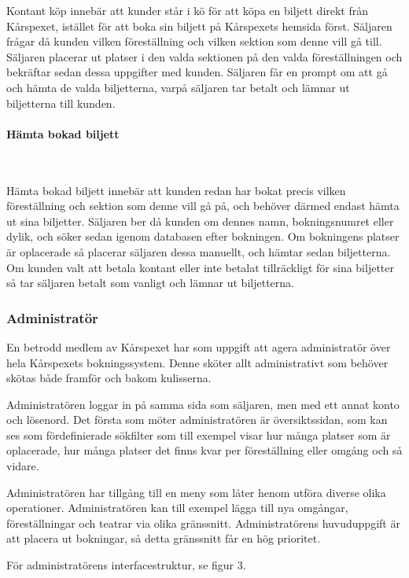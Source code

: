 \documentclass[a4paper, twoside, 11pt, titlepage]{article}
\begin{document}
			Kontant köp innebär att kunder står i kö för att köpa en biljett direkt från Kårspexet, istället för att boka sin biljett på Kårspexets hemsida först. Säljaren frågar då kunden vilken föreställning och vilken sektion som denne vill gå till. Säljaren placerar ut platser i den valda sektionen på den valda föreställningen och bekräftar sedan dessa uppgifter med kunden. Säljaren får en prompt om att gå och hämta de valda biljetterna, varpå säljaren tar betalt och lämnar ut biljetterna till kunden.

			\paragraph{Hämta bokad biljett}\

			Hämta bokad biljett innebär att kunden redan har bokat precis vilken föreställning och sektion som denne vill gå på, och behöver därmed endast hämta ut sina biljetter. Säljaren ber då kunden om dennes namn, bokningsnumret eller dylik, och söker sedan igenom databasen efter bokningen. Om bokningens platser är oplacerade så placerar säljaren dessa manuellt, och hämtar sedan biljetterna. Om kunden valt att betala kontant eller inte betalat tillräckligt för sina biljetter så tar säljaren betalt som vanligt och lämnar ut biljetterna.

		\subsubsection{Administratör}


		En betrodd medlem av Kårspexet har som uppgift att agera administratör över hela Kårspexets bokningssystem. Denne sköter allt administrativt som behöver skötas både framför och bakom kulisserna. 

		Administratören loggar in på samma sida som säljaren, men med ett annat konto och lösenord. Det första som möter administratören är översiktssidan, som kan ses som fördefinierade sökfilter som till exempel visar hur många platser som är oplacerade, hur många platser det finns kvar per föreställning eller omgång och så vidare. 

		Administratören har tillgång till en meny som låter henom utföra diverse olika operationer. Administratören kan till exempel lägga till nya omgångar, föreställningar och teatrar via olika gränssnitt. Administratörens huvuduppgift är att placera ut bokningar, så detta gränssnitt får en hög prioritet.  

		För administratörens interfacestruktur, se figur 3.
\end{document}
